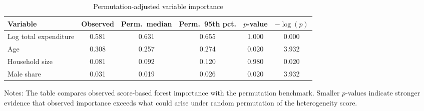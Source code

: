 \begin{table}[htbp]
\centering
\begin{threeparttable}
\caption{Permutation-adjusted variable importance}
\label{tab:perm_results}
\footnotesize
\begin{tabular*}{\textwidth}{@{\extracolsep{\fill}}lccccc@{}}
\toprule
Variable & Observed & Perm.\ median & Perm.\ 95th pct. & $p$-value & $-\log(p)$ \\
\midrule
Log total expenditure & 0.581 & 0.631 & 0.655 & 1.000 & 0.000 \\
Age & 0.308 & 0.257 & 0.274 & 0.020 & 3.932 \\
Household size & 0.081 & 0.092 & 0.120 & 0.980 & 0.020 \\
Male share & 0.031 & 0.019 & 0.026 & 0.020 & 3.932 \\
\bottomrule
\end{tabular*}
\begin{tablenotes}[flushleft]
\footnotesize
\item Notes: The table compares observed score-based forest importance with the permutation benchmark. Smaller $p$-values indicate stronger evidence that observed importance exceeds what could arise under random permutation of the heterogeneity score.
\end{tablenotes}
\end{threeparttable}
\end{table}
